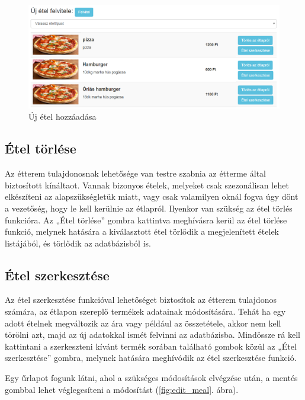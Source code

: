 \begin{figure}
\centering
\includegraphics[scale=0.5]{kepek/new_meal.png}
\caption{Új étel hozzáadása}
\label{fig:new_meal}
\end{figure}

\subsection{Étel törlése}

Az étterem tulajdonosnak lehetősége van testre szabnia az étterme által biztosított kínáltaot. Vannak bizonyos ételek, melyeket csak szezonálisan lehet elkészíteni az alapszükségletük miatt, vagy csak valamilyen oknál fogva úgy dönt a vezetőség, hogy le kell kerülnie az étlapról. Ilyenkor van szükség az étel törlés funkcióra. Az „Étel törlése” gombra kattintva meghívásra kerül az étel törlése funkció, melynek hatására a kiválasztott étel törlődik a megjelenített ételek listájából, és törlődik az adatbázisból is.

\subsection{Étel szerkesztése}

Az étel szerkesztése funkcióval lehetőséget biztosítok az étterem tulajdonos számára, az étlapon szereplő termékek adatainak módosítására. Tehát ha egy adott ételnek megváltozik az ára vagy például az összetétele, akkor nem kell törölni azt, majd az új adatokkal ismét felvinni az adatbázisba. Mindössze rá kell kattintani a szerkeszteni kívánt termék sorában található gombok közül az „Étel szerkesztése” gombra, melynek hatására meghívódik az étel szerkesztése funkció.

Egy űrlapot fogunk látni, ahol a szükséges módosítások elvégzése után, a mentés gombbal lehet véglegesíteni a módosítást (\ref{fig:edit_meal}. ábra).


